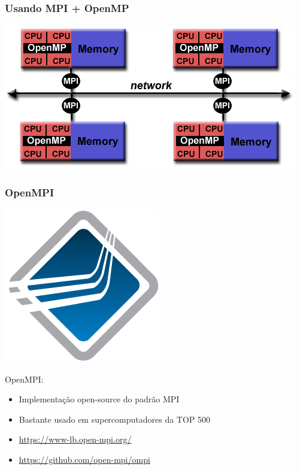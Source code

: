 \documentclass[12pt, compress, aspectratio=169, xcolor={table,usenames,dvipsnames}]{beamer}
\begin{document}
\begin{frame}
    \frametitle{Usando MPI + OpenMP}
    \begin{center}
        \includegraphics[width=.6\textwidth]{hybrid-model}
    \end{center}
\end{frame}


\begin{frame}
    \frametitle{OpenMPI}
    \begin{center}
        \includegraphics[width=.2\textwidth]{open-mpi-logo}
    \end{center}

    \alert{OpenMPI}:

    \begin{itemize}
        \item Implementação \alert{open-source} do padrão MPI
        \item Bastante usado em supercomputadores da \alert{TOP 500}
        \item \url{https://www-lb.open-mpi.org/}
        \item \url{https://github.com/open-mpi/ompi}
    \end{itemize}
\end{frame}
\end{document}
